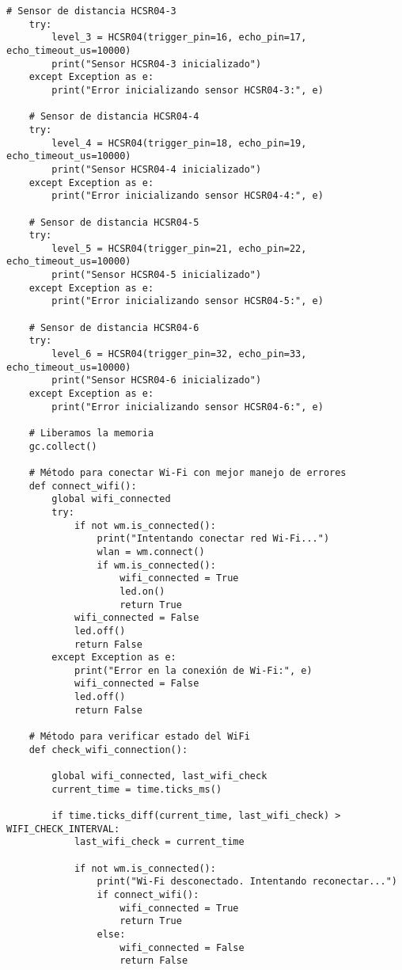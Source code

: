 \begin{lstlisting}[label=cod:firmware,caption=Firmware nodo sensor de consumos. , language=PythonUTF8]
    # Sensor de distancia HCSR04-3
    try:
        level_3 = HCSR04(trigger_pin=16, echo_pin=17, echo_timeout_us=10000)
        print("Sensor HCSR04-3 inicializado")
    except Exception as e:
        print("Error inicializando sensor HCSR04-3:", e)
        
    # Sensor de distancia HCSR04-4
    try:
        level_4 = HCSR04(trigger_pin=18, echo_pin=19, echo_timeout_us=10000)
        print("Sensor HCSR04-4 inicializado")
    except Exception as e:
        print("Error inicializando sensor HCSR04-4:", e)
        
    # Sensor de distancia HCSR04-5
    try:
        level_5 = HCSR04(trigger_pin=21, echo_pin=22, echo_timeout_us=10000)
        print("Sensor HCSR04-5 inicializado")
    except Exception as e:
        print("Error inicializando sensor HCSR04-5:", e)
    
    # Sensor de distancia HCSR04-6
    try:
        level_6 = HCSR04(trigger_pin=32, echo_pin=33, echo_timeout_us=10000)
        print("Sensor HCSR04-6 inicializado")
    except Exception as e:
        print("Error inicializando sensor HCSR04-6:", e)
        
    # Liberamos la memoria
    gc.collect()
        
    # Método para conectar Wi-Fi con mejor manejo de errores
    def connect_wifi():
        global wifi_connected
        try:
            if not wm.is_connected():
                print("Intentando conectar red Wi-Fi...")
                wlan = wm.connect()
                if wm.is_connected():
                    wifi_connected = True
                    led.on()
                    return True  
            wifi_connected = False
            led.off()
            return False
        except Exception as e:
            print("Error en la conexión de Wi-Fi:", e)
            wifi_connected = False
            led.off()
            return False
    
    # Método para verificar estado del WiFi
    def check_wifi_connection():
        
        global wifi_connected, last_wifi_check
        current_time = time.ticks_ms()
        
        if time.ticks_diff(current_time, last_wifi_check) > WIFI_CHECK_INTERVAL:
            last_wifi_check = current_time
            
            if not wm.is_connected():
                print("Wi-Fi desconectado. Intentando reconectar...")
                if connect_wifi():
                    wifi_connected = True
                    return True
                else:
                    wifi_connected = False
                    return False
            

\end{lstlisting}

